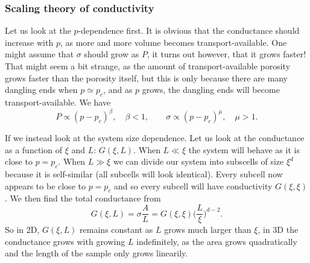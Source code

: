 \documentclass[a4paper, 11pt, notitlepage, english]{article}
\begin{document}
\subsubsection*{Scaling theory of conductivity}

Let us look at the $p$-dependence first. It is obvious that the conductance should increase with $p$, as more and more volume becomes transport-available. One might assume that $\sigma$ should grow as $P$, it turns out however, that it grows faster! That might seem a bit strange, as the amount of transport-available porosity grows faster than the porosity itself, but this is only because there are many dangling ends when $p\simeq p_c$, and as $p$ grows, the dangling ends will become transport-available. We have
$$P \propto (p-p_c)^\beta, \quad \beta < 1, \qquad \sigma \propto (p-p_c)^\mu, \quad \mu > 1.$$

If we instead look at the system size dependence. Let us look at the conductance as a function of $\xi$ and $L$: $G(\xi, L)$. When $L \ll \xi$ the system will behave as it is close to $p = p_c$. When $L \gg \xi$ we can divide our system into subscells of size $\xi^d$ because it is self-similar (all subcells will look identical). Every subcell now appears to be close to $p = p_c$ and so every subcell will have conductivity $G(\xi, \xi)$. We then find the total conductance from
$$G(\xi, L) = \sigma \frac{A}{L} = G(\xi, \xi) \bigg(\frac{L}{\xi}\bigg)^{d-2}.$$
So in 2D, $G(\xi, L)$ remains constant as $L$ grows much larger than $\xi$, in 3D the conductance grows with growing $L$ indefinitely, as the area grows quadratically and the length of the sample only grows linearily. 
\end{document}
